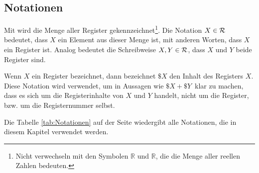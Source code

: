 \subsection{Notationen}


Mit \Reg\index{\Reg} wird die Menge aller Register
gekennzeichnet\footnote{Nicht verwechseln mit den Symbolen $\mathds{R}$ und
$\mathbb{R}$, die die Menge aller reellen Zahlen bedeuten.}.
Die Notation $X \in \mathcal{R}$ bedeutet, dass $X$ ein Element aus dieser Menge ist,
mit anderen Worten, dass $X$ ein Register ist. Analog bedeutet die
Schreibweise $X,Y \in \mathcal{R}$, dass $X$ und $Y$ beide Register sind.


Wenn $X$ ein Register bezeichnet, dann bezeichnet $\$X$ den Inhalt des
Registers $X$. Diese Notation wird verwendet, um in Aussagen wie 
\glqq $\$X + \$Y$\grqq\ klar zu machen, dass es sich um die Registerinhalte von
$X$ und $Y$ handelt, nicht um die Register, bzw. um die Registernummer selbst.

Die Tabelle \ref{tab:Notationen} auf der Seite \pageref{tab:Notationen}
wiedergibt alle Notationen, die in diesem Kapitel verwendet werden.

